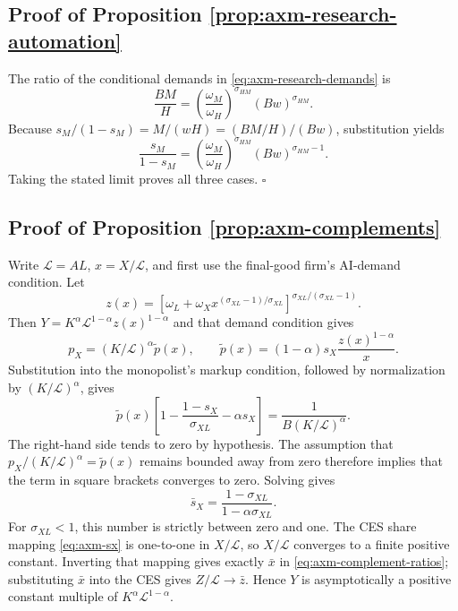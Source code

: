 \subsection{Proof of Proposition \ref{prop:axm-research-automation}}

The ratio of the conditional demands in \eqref{eq:axm-research-demands} is
\[
 \frac{BM}{H}
 =\left(\frac{\omega_M}{\omega_H}\right)^{\sigma_{HM}}
  (Bw)^{\sigma_{HM}}.
\]
Because \(s_M/(1-s_M)=M/(wH)=(BM/H)/(Bw)\), substitution yields
\[
 \frac{s_M}{1-s_M}
 =\left(\frac{\omega_M}{\omega_H}\right)^{\sigma_{HM}}
  (Bw)^{\sigma_{HM}-1}.
\]
Taking the stated limit proves all three cases. \(\square\)

\subsection{Proof of Proposition \ref{prop:axm-complements}}

Write \(\mathcal L=AL\), \(x=X/\mathcal L\), and first use the final-good
firm's AI-demand condition.
Let
\[
 z(x)=\left[\omega_L+\omega_Xx^{(\sigma_{XL}-1)/\sigma_{XL}}
 \right]^{\sigma_{XL}/(\sigma_{XL}-1)}.
\]
Then \(Y=K^\alpha\mathcal L^{1-\alpha}z(x)^{1-\alpha}\) and that demand condition gives
\[
 p_X=(K/\mathcal L)^\alpha\widetilde p(x),\qquad
 \widetilde p(x)=(1-\alpha)s_X\frac{z(x)^{1-\alpha}}{x}.
\]
Substitution into the monopolist's markup condition, followed by normalization
by \((K/\mathcal L)^\alpha\), gives
\[
 \widetilde p(x)
 \left[1-\frac{1-s_X}{\sigma_{XL}}-\alpha s_X\right]
 =\frac{1}{B(K/\mathcal L)^\alpha}.
\]
The right-hand side tends to zero by hypothesis. The assumption that
\(p_X/(K/\mathcal L)^\alpha=\widetilde p(x)\) remains bounded away from zero therefore
implies that the term in square brackets converges to zero. Solving gives
\[
 \bar s_X=\frac{1-\sigma_{XL}}{1-\alpha\sigma_{XL}}.
\]
For \(\sigma_{XL}<1\), this number is strictly between zero and one. The CES share
mapping \eqref{eq:axm-sx} is one-to-one in \(X/\mathcal L\), so \(X/\mathcal L\) converges to a
finite positive constant. Inverting that mapping gives exactly \(\bar x\) in
\eqref{eq:axm-complement-ratios}; substituting \(\bar x\) into the CES gives
\(Z/\mathcal L\to\bar z\). Hence \(Y\) is asymptotically a positive constant multiple
of \(K^\alpha\mathcal L^{1-\alpha}\).

